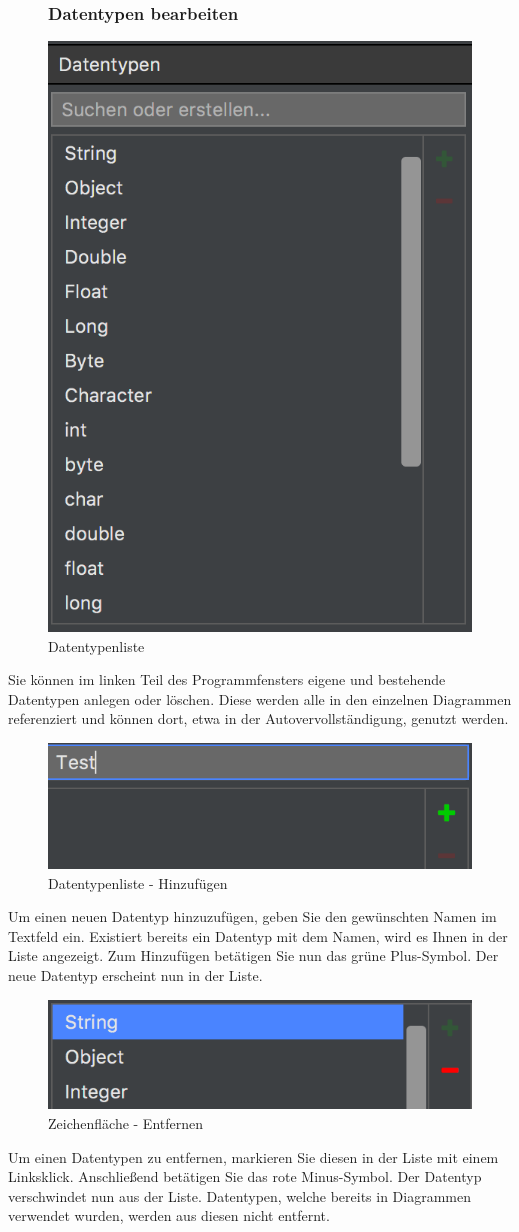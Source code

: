 \begin{figure}[H]
\subsubsection{Datentypen bearbeiten}
	\centering
	\includegraphics[width=.4\textwidth]{Datentypen.png}
	\caption{Datentypenliste}
\end{figure}
Sie können im linken Teil des Programmfensters eigene und bestehende Datentypen anlegen oder löschen. Diese werden alle in den einzelnen Diagrammen referenziert und können dort, etwa in der Autovervollständigung, genutzt werden.

\begin{figure}[H]
	\centering
	\includegraphics[width=.4\textwidth]{Datentypen_Add.png}
	\caption{Datentypenliste - Hinzufügen}
\end{figure}
Um einen neuen Datentyp hinzuzufügen, geben Sie den gewünschten Namen im Textfeld ein. Existiert bereits ein Datentyp mit dem Namen, wird es Ihnen in der Liste angezeigt. Zum Hinzufügen betätigen Sie nun das grüne Plus-Symbol. Der neue Datentyp erscheint nun in der Liste.

\begin{figure}[H]
	\centering
	\includegraphics[width=.4\textwidth]{Datentypen_Delete.png}
	\caption{Zeichenfläche - Entfernen}
\end{figure}
Um einen Datentypen zu entfernen, markieren Sie diesen in der Liste mit einem Linksklick. Anschließend betätigen Sie das rote Minus-Symbol. Der Datentyp verschwindet nun aus der Liste. Datentypen, welche bereits in Diagrammen verwendet wurden, werden aus diesen nicht entfernt.





